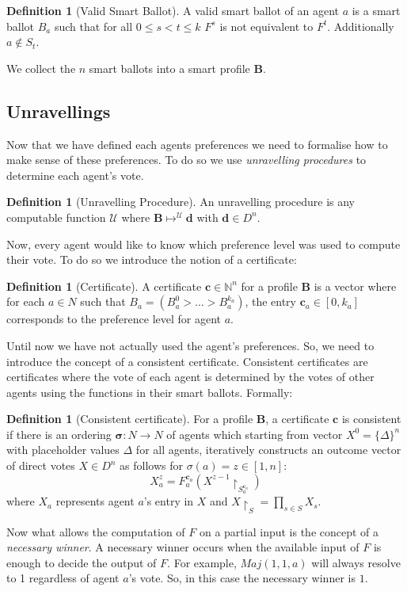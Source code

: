 \documentclass[11pt,a4paper, titlepage]{article}
\theoremstyle{definition}
\newtheorem{definition}[theorem]{Definition}
\let\vec\mathbf
\begin{document}
\begin{definition}[Valid Smart Ballot]
    A valid smart ballot of an agent $a$ is a smart ballot $B_a$ such that for all $ 0 \leq s < t \leq k$ $F^s$ is not equivalent to $F^t$. Additionally $a \notin S_t$.
\end{definition}


We collect the $n$ smart ballots into a smart profile $\mathbf{B}$.

\subsection{Unravellings}

Now that we have defined each agents preferences we need to formalise how to make sense of these preferences. To do so we use \emph{unravelling procedures} to determine each agent's vote.

\begin{definition}[Unravelling Procedure]
    An unravelling procedure is any computable function $\mathcal{U}$ where $\mathbf{B} \mapsto^\mathcal{U} \vec{d}$ with $\vec{d} \in D^n$.


\end{definition}

Now, every agent would like to know which preference level was used to compute their vote. To do so we introduce the notion of a certificate:

\begin{definition}[Certificate]
    A certificate $\mathbf{c} \in \mathbb{N}^n$ for a profile $\mathbf{B}$ is a vector where for each $a \in N$ such that $B_a = (B_a^0 > \ldots > B_a^{k_a})$, the entry $\mathbf{c}_a \in [0, k_a]$ corresponds to the preference level for agent $a$.  
\end{definition}

Until now we have not actually used the agent's preferences. So, we need to introduce the concept of a consistent certificate. Consistent certificates are certificates where the vote of each agent is determined by the votes of other agents using the functions in their smart ballots. Formally:

\begin{definition}[Consistent certificate]
    For a profile $\mathbf{B}$, a certificate $\mathbf{c}$ is consistent if there is an ordering $\mathbf{\sigma} \colon N \longrightarrow N$ of agents which starting from vector $X^0 = \{\Delta\}^n$ with placeholder values $\Delta$ for all agents, iteratively constructs an outcome vector of direct votes $X \in D^n$ as follows for $\sigma(a) = z \in [1,n]$:
    \[
        X^z_a = F^{\mathbf{c}_a}_a(X^{z-1} \restriction_{S^{\mathbf{c}_a}_a} )
    \]
    where $X_a$ represents agent $a$'s entry in $X$ and $X \restriction_S = \prod_{s \in S} X_s$.

\end{definition}
Now what allows the computation of $F$ on a partial input is the concept of a \emph{necessary winner}. A necessary winner occurs when the available input of $F$ is enough to decide  the output of $F$. For example, $\mathit{Maj}(1, 1, a)$ will always resolve to 1 regardless of agent $a$'s vote. So, in this case the necessary winner is $1$.
\end{document}
